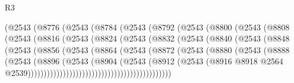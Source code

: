 \begin{lexlean}{R3}
\begin{coremodule}
                  (@2543
                    (@8776
                      (@2543
                        (@8784
                          (@2543
                            (@8792
                              (@2543
                                (@8800
                                  (@2543
                                    (@8808
                                      (@2543
                                        (@8816
                                          (@2543
                                            (@8824
                                              (@2543
                                                (@8832
                                                  (@2543
                                                    (@8840
                                                      (@2543
                                                        (@8848
                                                          (@2543
                                                            (@8856
                                                              (@2543
                                                                (@8864
                                                                  (@2543
                                                                    (@8872
                                                                      (@2543
                                                                        (@8880
                                                                          (@2543
                                                                            (@8888
                                                                              (@2543
                                                                                (@8896
                                                                                  (@2543
                                                                                    (@8904
                                                                                      (@2543
                                                                                        (@8912
                                                                                          (@2543
                                                                                            (@8916
                                                                                              @8918
                                                                                              @2564
                                                                                              @2539)))))))))))))))))))))))))))))))))))))))))))))

\end{coremodule}
\end{lexlean}
